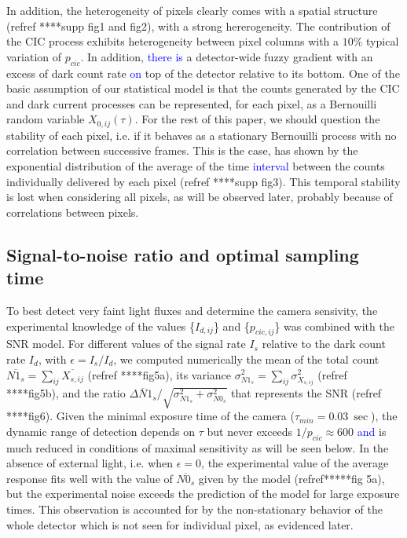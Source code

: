 \documentclass{article}
\begin{document}
In addition, the heterogeneity of pixels clearly comes with a spatial structure (refref ****supp fig1 and fig2), with a strong hererogeneity.
The contribution of the CIC process exhibits heterogeneity between pixel columns with a $10\%$ typical variation of $p_{cic}$.
In addition, \textcolor{blue}{there is} a detector-wide fuzzy gradient with an excess of dark count rate \textcolor{blue}{on} top of the detector relative to its bottom.
One of the basic assumption of our statistical model is that the counts generated by the CIC and dark current processes can be represented, for each pixel, as a Bernouilli random variable $X_{0,ij}(\tau)$.
For the rest of this paper, we should question the stability of each pixel, i.e. if it behaves as a stationary Bernouilli process with no correlation between successive frames. 
This is the case, has shown by the exponential distribution of the average of the time \textcolor{blue}{interval} between the counts individually delivered by each pixel (refref ****supp fig3).
This temporal stability is lost when considering all pixels, as will be observed later, probably because of correlations between pixels. 
\subsection*{Signal-to-noise ratio and optimal sampling time}

To best detect very faint light fluxes and determine the camera sensivity, the experimental knowledge of the values \{$I_{d,ij}$\} and \{${p_{cic,ij}}$\} was combined with the SNR model.
For different values of the signal rate $I_{s}$ relative to the dark count rate $I_{d}$, with  $\epsilon =I_{s}/I_{d}$, we computed numerically the mean of the total count $\overline{N1_s} = \sum_{ij} \overline{X_{s,ij}}$ (refref ****fig5a), its variance $\sigma^2_{N1_s} = \sum_{ij} \sigma^2_{X_{s,ij}}$ (refref ****fig5b), and the ratio $\overline{\Delta N1_s}/\sqrt{\sigma^2_{N1_s}+\sigma^2_{N0_s}}$ that represents the SNR (refref ****fig6). 
Given the minimal exposure time of the camera ($\tau_{min}=\SI{0.03}{\sec}$), the dynamic range of detection depends on $\tau$ but never exceeds $1/p_{cic} \approx 600$ \textcolor{blue}{and} is much reduced in conditions of maximal sensitivity as will be seen below.
In the absence of external light, i.e. when $\epsilon=0$, the experimental value of the average response fits well with the value of $\overline{N0_s}$ given by the model (refref*****fig 5a), but the experimental noise exceeds the prediction of the model for large exposure times.
This observation is accounted for by the non-stationary behavior of the whole detector which is not seen for individual pixel, as evidenced later.
\end{document}
